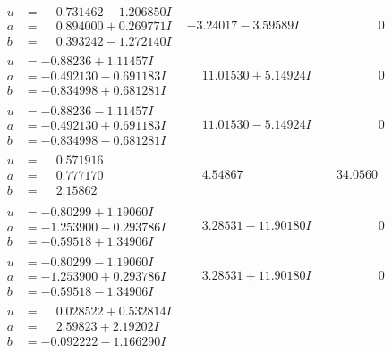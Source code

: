 \documentclass[1p]{elsarticle_modified}
\theoremstyle{definition}
\begin{document}
$$\begin{array}{c|c|c}
\begin{aligned}
u &= \phantom{-}0.731462 - 1.206850 I \\
a &= \phantom{-}0.894000 + 0.269771 I \\
b &= \phantom{-}0.393242 - 1.272140 I\end{aligned}
 & -3.24017 - 3.59589 I & \phantom{-0.000000 } 0 \\ \hline\begin{aligned}
u &= -0.88236 + 1.11457 I \\
a &= -0.492130 - 0.691183 I \\
b &= -0.834998 + 0.681281 I\end{aligned}
 & \phantom{-}11.01530 + 5.14924 I & \phantom{-0.000000 } 0 \\ \hline\begin{aligned}
u &= -0.88236 - 1.11457 I \\
a &= -0.492130 + 0.691183 I \\
b &= -0.834998 - 0.681281 I\end{aligned}
 & \phantom{-}11.01530 - 5.14924 I & \phantom{-0.000000 } 0 \\ \hline\begin{aligned}
u &= \phantom{-}0.571916\phantom{ +0.000000I} \\
a &= \phantom{-}0.777170\phantom{ +0.000000I} \\
b &= \phantom{-}2.15862\phantom{ +0.000000I}\end{aligned}
 & \phantom{-}4.54867\phantom{ +0.000000I} & \phantom{-}34.0560\phantom{ +0.000000I} \\ \hline\begin{aligned}
u &= -0.80299 + 1.19060 I \\
a &= -1.253900 - 0.293786 I \\
b &= -0.59518 + 1.34906 I\end{aligned}
 & \phantom{-}3.28531 - 11.90180 I & \phantom{-0.000000 } 0 \\ \hline\begin{aligned}
u &= -0.80299 - 1.19060 I \\
a &= -1.253900 + 0.293786 I \\
b &= -0.59518 - 1.34906 I\end{aligned}
 & \phantom{-}3.28531 + 11.90180 I & \phantom{-0.000000 } 0 \\ \hline\begin{aligned}
u &= \phantom{-}0.028522 + 0.532814 I \\
a &= \phantom{-}2.59823 + 2.19202 I \\
b &= -0.092222 - 1.166290 I\end{aligned}

\end{array}$$
\end{document}
